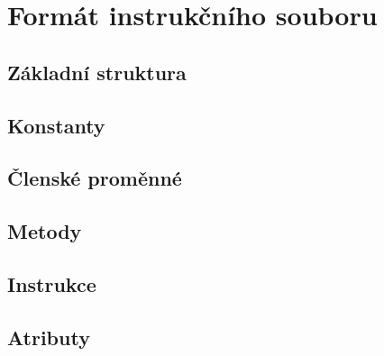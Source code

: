 \chapter{Formát instrukčního souboru}


\section{Základní struktura}


\section{Konstanty}


\section{Členské proměnné}


\section{Metody}


\section{Instrukce}


\section{Atributy}


